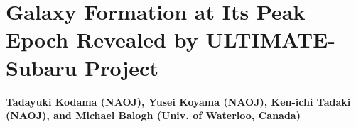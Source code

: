 

%



\newcommand\lya{Ly$\alpha$}
\newcommand\ha{H$\alpha$}
\newcommand\hb{H$\beta$}
\newcommand\paa{Pa$\alpha$}
\newcommand\oii{[O~{\sc ii}]}
\newcommand\oiii{[O~{\sc iii}]}
\newcommand\nii{[N~{\sc ii}]}

\def\gsim{\mathrel{\raise0.35ex\hbox{$\scriptstyle >$}\kern-0.6em %
\lower0.40ex\hbox{{$\scriptstyle \sim$}}}}
\def\lsim{\mathrel{\raise0.35ex\hbox{$\scriptstyle <$}\kern-0.6em %
\lower0.40ex\hbox{{$\scriptstyle \sim$}}}}
\def\msun{{\rm M}$_{\odot}$}

%
\section{Galaxy Formation at Its Peak Epoch Revealed by ULTIMATE-Subaru
 Project \label{sec:highzpeak}}

\noindent
\begin{center}
{\bf Tadayuki Kodama (NAOJ), Yusei Koyama (NAOJ), Ken-ichi Tadaki (NAOJ),
and Michael Balogh (Univ. of Waterloo, Canada)}
\end{center}
\vspace{0.5cm}

\normalsize
